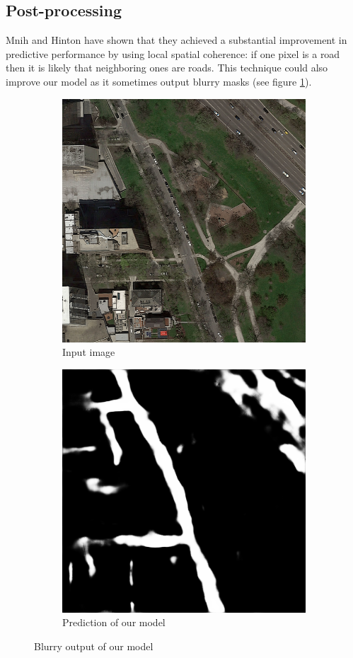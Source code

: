 \documentclass[10pt,conference,compsocconf]{IEEEtran}
\begin{document}
\subsection{Post-processing}
Mnih and Hinton \cite{post_processing} have shown that they achieved a substantial improvement in predictive performance by using local spatial coherence: if one pixel is a road then it is likely that neighboring ones are roads. This technique could also improve our model as it sometimes output blurry masks (see figure \ref{fig:blurry_output}).
\begin{figure}[ht]
    \centering
    \begin{subfigure}{0.45\linewidth}
        \centering
        \includegraphics[width=0.8\linewidth]{doc/images/blurry_input.png}
        \caption{Input image}
    \end{subfigure}
    \begin{subfigure}{0.45\linewidth}
        \centering
        \includegraphics[width=0.8\linewidth]{images/blurry_output.png}
        \caption{Prediction of our model}
    \end{subfigure}
    \caption{Blurry output of our model}
    \label{fig:blurry_output}
\end{figure}
\end{document}
